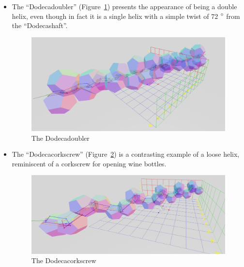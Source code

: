 \documentclass[mathematics,article,submit,pdftex,moreauthors]{Definitions/mdpi}
\begin{document}
\begin{itemize}
\item The ``Dodecadoubler'' (Figure~\ref{fig:dodecadoubler}) presents the appearance of being a double helix, even though in fact it is a single helix with
  a simple twist of 72 $\degree$ from the ``Dodecashaft''.
\begin{figure}
  \centering
  \captionsetup{justification=centering}
     \includegraphics[width=10 cm]{figures/Dodecadoubler.png}
     \caption{The Dodecadoubler}
  \label{fig:dodecadoubler}
\end{figure}
\unskip

\item The ``Dodecacorkscrew'' (Figure~\ref{fig:dodecacorkscrew}) is a contrasting example of a loose helix, reminiscent of a corkscrew for opening wine bottles.
\begin{figure}
  \centering
  \captionsetup{justification=centering}
     \includegraphics[width=10 cm]{figures/Dodecacorkscrew.png}
     \caption{The Dodecacorkscrew}
  \label{fig:dodecacorkscrew}
\end{figure}
\unskip


\end{itemize}
\end{document}
